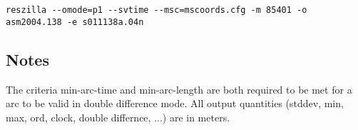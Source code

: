 \begin{\outputsize}
\begin{lstlisting}
reszilla --omode=p1 --svtime --msc=mscoords.cfg -m 85401 -o asm2004.138 -e s011138a.04n
\end{lstlisting}
\end{\outputsize}

\subsection{Notes}
The criteria min-arc-time and min-arc-length are both required to be met
for a arc to be valid in double difference mode.
All output quantities (stddev, min, max, ord, clock, double differnce, ...)
are in meters.

%

